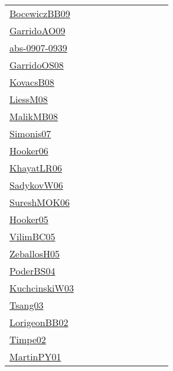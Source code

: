 {\begin{longtable}{p{3cm}p{4cm}p{2cm}p{2cm}p{2cm}p{2cm}p{2cm}p{2cm}p{2cm}p{2cm}}
\href{}{BocewiczBB09}~\cite{BocewiczBB09} &  &  &  &  &  &  &  &  & \\
\href{articles/GarridoAO09.pdf}{GarridoAO09}~\cite{GarridoAO09} &  &  &  &  &  &  &  &  & \\
\href{articles/abs-0907-0939.pdf}{abs-0907-0939}~\cite{abs-0907-0939} &  &  &  &  &  &  &  &  & \\
\href{articles/GarridoOS08.pdf}{GarridoOS08}~\cite{GarridoOS08} &  &  &  &  &  &  &  &  & \\
\href{articles/KovacsB08.pdf}{KovacsB08}~\cite{KovacsB08} &  &  &  &  &  &  &  &  & \\
\href{articles/LiessM08.pdf}{LiessM08}~\cite{LiessM08} &  &  &  &  &  &  &  &  & \\
\href{}{MalikMB08}~\cite{MalikMB08} &  &  &  &  &  &  &  &  & \\
\href{articles/Simonis07.pdf}{Simonis07}~\cite{Simonis07} &  &  &  &  &  &  &  &  & \\
\href{articles/Hooker06.pdf}{Hooker06}~\cite{Hooker06} &  &  &  &  &  &  &  &  & \\
\href{articles/KhayatLR06.pdf}{KhayatLR06}~\cite{KhayatLR06} &  &  &  &  &  &  &  &  & \\
\href{}{SadykovW06}~\cite{SadykovW06} &  &  &  &  &  &  &  &  & \\
\href{}{SureshMOK06}~\cite{SureshMOK06} &  &  &  &  &  &  &  &  & \\
\href{articles/Hooker05.pdf}{Hooker05}~\cite{Hooker05} &  &  &  &  &  &  &  &  & \\
\href{articles/VilimBC05.pdf}{VilimBC05}~\cite{VilimBC05} &  &  &  &  &  &  &  &  & \\
\href{articles/ZeballosH05.pdf}{ZeballosH05}~\cite{ZeballosH05} &  &  &  &  &  &  &  &  & \\
\href{articles/PoderBS04.pdf}{PoderBS04}~\cite{PoderBS04} &  &  &  &  &  &  &  &  & \\
\href{articles/KuchcinskiW03.pdf}{KuchcinskiW03}~\cite{KuchcinskiW03} &  &  &  &  &  &  &  &  & \\
\href{articles/Tsang03.pdf}{Tsang03}~\cite{Tsang03} &  &  &  &  &  &  &  &  & \\
\href{}{LorigeonBB02}~\cite{LorigeonBB02} &  &  &  &  &  &  &  &  & \\
\href{articles/Timpe02.pdf}{Timpe02}~\cite{Timpe02} &  &  &  &  &  &  &  &  & \\
\href{articles/MartinPY01.pdf}{MartinPY01}~\cite{MartinPY01} &  &  &  &  &  &  &  &  & \\

\end{longtable}}
